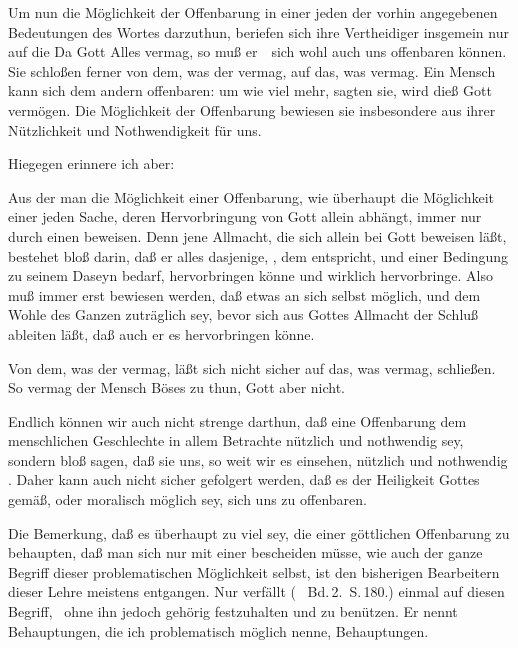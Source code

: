 \begin{aufza}
\item Um nun die Möglichkeit der Offenbarung in einer jeden der vorhin angegebenen Bedeutungen des Wortes darzuthun, beriefen sich ihre Vertheidiger insgemein nur auf die  Da Gott Alles vermag, so muß er~\ sich wohl auch uns offenbaren können. Sie schloßen ferner von dem, was der  vermag, auf das, was  vermag. Ein Mensch kann sich dem andern offenbaren: um wie viel mehr, sagten sie, wird dieß Gott vermögen. Die  Möglichkeit der Offenbarung bewiesen sie insbesondere aus ihrer Nützlichkeit und Nothwendigkeit für uns.
\item Hiegegen erinnere ich aber:
\begin{aufzb}
\item Aus der  man die Möglichkeit einer Offenbarung, wie überhaupt die Möglichkeit einer jeden Sache, deren Hervorbringung von Gott allein abhängt, immer nur durch einen  beweisen. Denn jene Allmacht, die sich allein bei Gott beweisen läßt, bestehet bloß darin, daß er alles dasjenige, , dem  entspricht, und einer Bedingung zu seinem Daseyn bedarf, hervorbringen könne und wirklich hervorbringe. Also muß immer erst bewiesen werden, daß etwas an sich selbst möglich, und dem Wohle des Ganzen zuträglich sey, bevor sich aus Gottes Allmacht der Schluß ableiten läßt, daß auch er es hervorbringen könne.
\item Von dem, was der  vermag, läßt sich nicht sicher auf das, was  vermag, schließen. So vermag der Mensch Böses zu thun, Gott aber nicht.
\item Endlich können wir auch nicht strenge darthun, daß eine Offenbarung dem menschlichen Geschlechte in allem Betrachte nützlich und nothwendig sey, sondern bloß sagen, daß sie uns, so weit wir es einsehen, nützlich und nothwendig . Daher kann auch nicht sicher gefolgert werden, daß es der Heiligkeit Gottes gemäß, oder moralisch möglich sey, sich uns zu offenbaren.
\begin{RWanm}
Die Bemerkung, daß es überhaupt zu viel sey, die  einer göttlichen Offenbarung zu behaupten, daß man sich nur mit einer  bescheiden müsse, wie auch der ganze Begriff dieser problematischen Möglichkeit selbst, ist den bisherigen Bearbeitern dieser Lehre meistens entgangen. Nur  verfällt ( \usw\ Bd.\,2.\ S.\,180.) einmal auf diesen Begriff, \ ohne ihn jedoch gehörig festzuhalten und zu benützen. Er nennt Behauptungen, die ich problematisch möglich nenne,  Behauptungen. \end{RWanm}
\end{aufzb}
\end{aufza}
   
